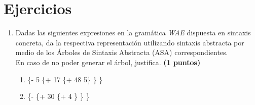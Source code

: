 \documentclass[11pt]{article}
\begin{document}
\section*{Ejercicios}

\begin{enumerate}[leftmargin=0.8cm]

    \item Dadas las siguientes expresiones en la gramática \textit{WAE} dispuesta en sintaxis concreta, da la respectiva representación utilizando sintaxis abstracta por medio de los Árboles de Sintaxis Abstracta (ASA) correspondientes.\\
    En caso de no poder generar el árbol, justifica. \textbf{(1 puntos)}
    \begin{enumerate}
        \item \{- 5 \{+ 17 \{+ 48 5\} \} \}
        \item \{- \{+ 30 \{+ 4 \} \} \}
    \end{enumerate}
    

\end{enumerate}
\end{document}
